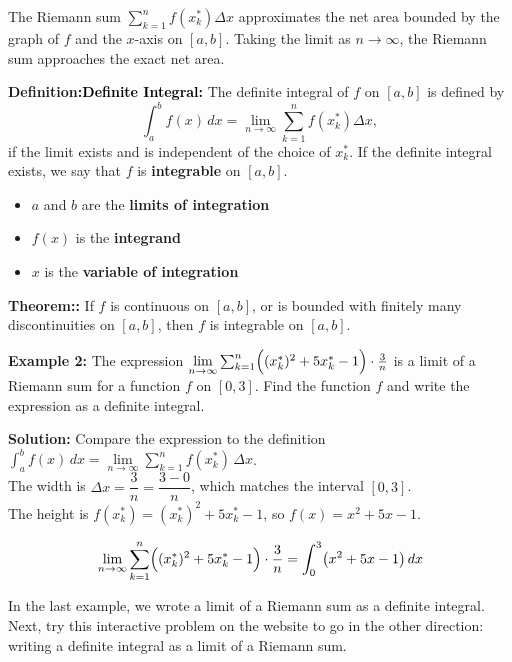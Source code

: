 \documentclass[12pt]{article}
\renewcommand{\lim}{\mathop{\mathrm{lim}}\limits}
\newcommand{\msColor}[2]{\textcolor{#1}{#2}}
\newcommand{\msDef}[1]{\textbf{\msColor{TextBlue}{Definition}}\if\relax\detokenize{#1}\relax\textbf{\msColor{black}{:}}\else\textbf{\;\msColor{black}{#1:}}\fi}
\newcommand{\msThm}[1]{\textbf{\msColor{TextTeal}{Theorem}}\if\relax\detokenize{#1}\relax\textbf{\msColor{black}{:}}\else\textbf{\;\msColor{black}{#1:}}\fi}
\begin{document}
The Riemann sum $\sum_{k=1}^n f(x_k^*) \Delta x$ approximates the net area bounded by the graph of $f$ and the $x$-axis on $[a,b]$. 
Taking the limit as $n \to \infty$, the Riemann sum approaches the exact net area.

\msDef{Definite Integral}
The definite integral of $f$ on $[a,b]$ is defined by
\[ \int_a^b f(x) \, dx = \lim_{n \to \infty} \sum_{k=1}^n f(x_k^*) \Delta x, \]
if the limit exists and is independent of the choice of $x_k^*$. 
If the definite integral exists, we say that $f$ is \textbf{integrable} on $[a,b]$.

\begin{itemize}
\item $a$ and $b$ are the \textbf{limits of integration}
\item $f(x)$ is the \textbf{integrand}
\item $x$ is the \textbf{variable of integration}
\end{itemize}

\msThm{} If $f$ is continuous on $[a,b]$, or is bounded with finitely many discontinuities on $[a,b]$, then $f$ is integrable on $[a,b]$.

\vfill

\textbf{Example 2: } 
The expression 
$\lim_{n \to \infty} \sum_{k=1}^n \Bigl((x_k^*)^2 + 5x_k^* - 1 \Bigr) \cdot \frac{3}{n}$ 
is a limit 
of a Riemann sum 
for a function $f$ 
on $[0,3]$.
Find the function $f$ 
and write the expression 
as a definite integral.

\textbf{Solution: } Compare the expression to the definition $\displaystyle\int_a^b f(x)\,dx = \lim_{n \to \infty} \sum_{k=1}^n f(x_k^*)\,\Delta x$. \\[0.1cm]
The width is $\Delta x = \dfrac{3}{n} = \dfrac{3-0}{n}$, which matches the interval $[0,3]$. \\[0.1cm]
The height is $f(x_k^*) = (x_k^*)^2 + 5x_k^* - 1$, so $f(x) = x^2 + 5x - 1$.

\begin{align*}
\lim_{n \to \infty} \sum_{k=1}^n \Bigl((x_k^*)^2 + 5x_k^* - 1\Bigr)\cdot \frac{3}{n} = \int_0^3 \bigl(x^2 + 5x - 1\bigr) \,dx
\end{align*}

\vfill

\newpage

In the last example, we wrote a limit of a Riemann sum as a definite integral.
Next, try this interactive problem on the website to go in the other direction: writing a definite integral as a limit of a Riemann sum.
\end{document}
